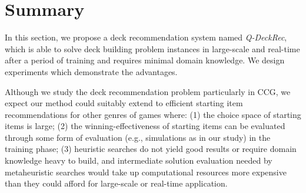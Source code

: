 \section{Summary}\label{sec:conclusion}
In this section, we propose a deck recommendation system named \textit{Q-DeckRec}, which is able to solve deck building problem instances in large-scale and real-time after a period of training and requires minimal domain knowledge. We design experiments which demonstrate the advantages. 

Although we study the deck recommendation problem particularly in CCG, we expect our method could suitably extend to efficient starting item recommendations for other genres of games where: (1) the choice space of starting items is large; (2) the winning-effectiveness of starting items can be evaluated through some form of evaluation (e.g., simulations as in our study) in the training phase; (3) heuristic searches do not yield good results or require domain knowledge heavy to build, and intermediate solution evaluation needed by metaheuristic searches would take up computational resources more expensive than they could afford for large-scale or real-time application.









